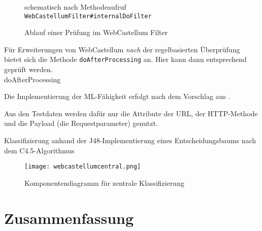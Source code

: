 \begin{figure}[h]
  \centering
  
  \caption{Ablauf einer Prüfung im WebCastellum Filter}
  \label{fig:wcfilter}
  \medskip
  \small
  schematisch nach Methodeaufruf \verb=WebCastellumFilter#internalDoFilter=
\end{figure}

Für Erweiterungen von WebCastellum \emph{nach} der regelbasierten Überprüfung bietet sich die Methode \verb=doAfterProcessing= an. Hier kann dann entsprechend geprüft werden.\\

doAfterProcessing

Die Implementierung der ML-Fähigkeit erfolgt nach dem Vorschlag aus \cite{kozik2014}.

Aus den Testdaten werden dafür nur die Attribute der URL, der HTTP-Methode und die Payload (die Requestparameter) genutzt. 

Klassifizierung anhand der J48-Implementierung eines Entscheidungsbaums nach dem C4.5-Algorithmus

\begin{figure}[h]
    \centering
    \texttt{[image: webcastellumcentral.png]}
    \caption{Komponentendiagramm für zentrale Klassifizierung}
    \label{fig:my_future}
\end{figure}



\section{Zusammenfassung}

